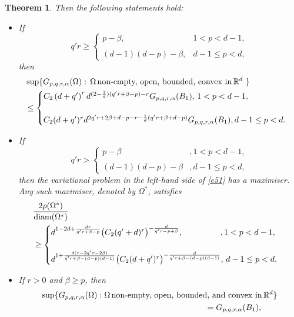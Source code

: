 \documentclass[a4paper,9pt]{article}
\newcommand{\R}{\mathbb{R}}
\newtheorem{theorem}{Theorem}
\newcommand{\Om}{\Omega}
\begin{document}
\begin{theorem}
Then the following statements hold:
\begin{itemize}
\item[\textup{(i)}] If
\begin{equation*}%
q'r\ge \begin{cases}p-\beta,&1<p<  d-1,\\
&\\
(d-1)(d-p)-\beta,& d-1\le p<d,
\end{cases}
\end{equation*}
then
\begin{align}\label{e51}
&\sup \{G_{p,q,r,\alpha}(\Om):\,\Om\, \textup{non-empty, open,  bounded, convex in}\,\R^d\ \}\nonumber\\&\le \begin{cases}C_2\left(d+q'\right)^rd^{(2-\frac1d)(q'r+\beta-p)-r}G_{p,q,r,\alpha}(B_1),\,1<p< d-1,\\ \\
C_2(d+q')^rd^{2q'r+2\beta+d-p-r-\frac{1}{d}(q'r+\beta+d-p)}G_{p,q,r,\alpha}(B_1),
 d-1\le p<d.
\end{cases}
\end{align}
\item[\textup{(ii)}]If
\begin{equation}\label{e52}
q'r> \begin{cases}p-\beta &,1<p< d
-1,\\
&\\
(d-1)(d-p)-\beta&, d-1\le p<d,
\end{cases}
\end{equation}
then the variational problem in the left-hand side of \eqref{e51} has a maximiser. Any such  maximiser, denoted by $\Omega^*$, satisfies
\begin{align}\label{e53}
&\frac{2\rho(\Omega^*)}{\textup{diam}(\Omega^*)}\nonumber\\&\ge \begin{cases} d^{1-2d+\frac{dr}{q'r+\beta-p}}\big(C_2(q'+d)^r\big)^{-\frac{d}{q'r-p+\beta}},\hspace{16mm},1<p< d-1,\\ \\
d^{1+\frac{d(r-2q'r-2\beta)}{q'r+\beta-(d-p)(d-1)}}\big(C_2(d+q')^r\big)^{-\frac{d}{q'r+\beta-(d-p)(d-1)}},\,d-1\le p<d.
\end{cases}
\end{align}
\item[\textup{(iii)}] If $r>0$ and $\beta \ge p$, then
\begin{align*}%
\sup\{G_{p,q,r,\alpha}(\Om): \Om\, &\textup{non-empty, open, bounded, and convex in}\,\R^d\}\nonumber\\&\hspace{40mm}=G_{p,q,r,\alpha}(B_1),

\end{align*}
\end{itemize}
\end{theorem}
\end{document}
